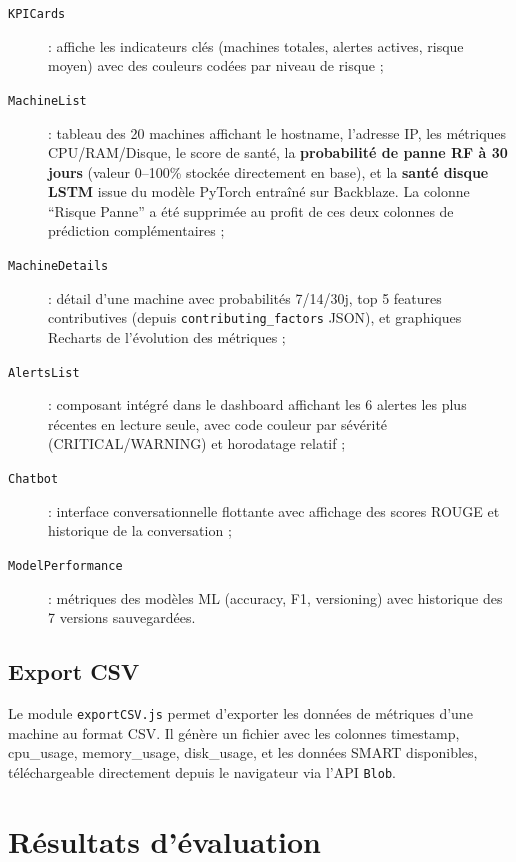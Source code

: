 \begin{description}
  \item[\texttt{KPICards}] : affiche les indicateurs clés (machines totales, alertes
        actives, risque moyen) avec des couleurs codées par niveau de risque ;
  \item[\texttt{MachineList}] : tableau des 20 machines affichant le hostname, l'adresse IP,
        les métriques CPU/RAM/Disque, le score de santé, la \textbf{probabilité de panne RF
        à 30 jours} (valeur 0--100\% stockée directement en base), et la \textbf{santé disque
        LSTM} issue du modèle PyTorch entraîné sur Backblaze. La colonne ``Risque Panne''
        a été supprimée au profit de ces deux colonnes de prédiction complémentaires ;
  \item[\texttt{MachineDetails}] : détail d'une machine avec probabilités 7/14/30j,
        top 5 features contributives (depuis \texttt{contributing\_factors} JSON),
        et graphiques Recharts de l'évolution des métriques ;
  \item[\texttt{AlertsList}] : composant intégré dans le dashboard affichant les 6 alertes
        les plus récentes en lecture seule, avec code couleur par sévérité (CRITICAL/WARNING)
        et horodatage relatif ;
  \item[\texttt{Chatbot}] : interface conversationnelle flottante avec affichage des
        scores ROUGE et historique de la conversation ;
  \item[\texttt{ModelPerformance}] : métriques des modèles ML (accuracy, F1, versioning)
        avec historique des 7 versions sauvegardées.
\end{description}

\subsection{Export CSV}

Le module \texttt{exportCSV.js} permet d'exporter les données de métriques d'une machine
au format CSV. Il génère un fichier avec les colonnes timestamp, cpu\_usage,
memory\_usage, disk\_usage, et les données SMART disponibles, téléchargeable directement
depuis le navigateur via l'API \texttt{Blob}.

\section{Résultats d'évaluation}

